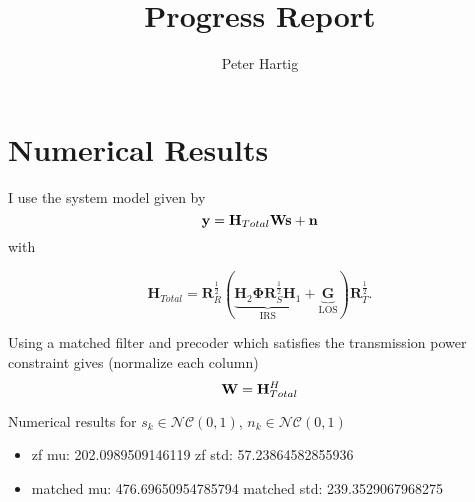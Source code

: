 \documentclass[12pt,a4paper]{report}
\title{Progress Report}
\author{Peter Hartig}
\begin{document}
\maketitle
\tableofcontents

\section{Numerical Results}
I use the system model given by 
\begin{equation}
\mathbf{y} = \mathbf{H}_{Total} \mathbf{W} \mathbf{s}  + \mathbf{n}
\end{equation}
with 

	\begin{equation}
	\mathbf{H}_{Total} = \mathbf{R}_{R}^{\frac{1}{2}}(\underbrace{\mathbf{H}_{2}\boldsymbol{\Phi}\mathbf{R}_{S}^{\frac{1}{2}}\mathbf{H}_{1}}_{\text{IRS}} + \underbrace{\mathbf{G}}_{\text{LOS}})\mathbf{R}_{T}^{\frac{1}{2}}.
	\end{equation}

Using a matched filter  and precoder which satisfies the transmission power constraint gives (normalize each column)
\begin{equation}
\mathbf{W} = \mathbf{H}_{Total}^H
\end{equation} 

Numerical results for $s_k \in \mathcal{NC}(0,1)$, $n_k \in \mathcal{NC}(0,1)$
\begin{itemize}
\item
zf mu: 202.0989509146119
zf std: 57.23864582855936
\item
matched mu: 476.69650954785794
matched std: 239.3529067968275
\end{itemize}



\end{document}
